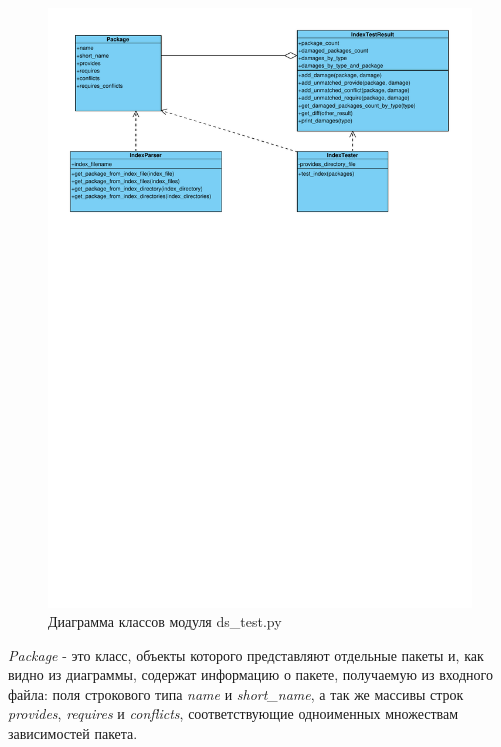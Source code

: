 \\
\begin{figure}[!ht]
\begin{center}
\includegraphics[scale=0.8, trim=10mm 180mm 10mm 0mm, clip]{../resources/uml/ds_test_class_diagram.pdf}
\caption{Диаграмма классов модуля ds\_test.py}
\label{gr:dstestclassdiag}
\end{center}
\end{figure}

\textit{Package} - это класс, объекты которого представляют отдельные пакеты и, как видно из диаграммы,
содержат информацию о пакете, получаемую из входного файла: поля строкового типа \textit{name} и 
\textit{short\_name}, а так же массивы строк \textit{provides}, \textit{requires}
и \textit{conflicts}, соответствующие одноименных множествам зависимостей пакета.
\\

